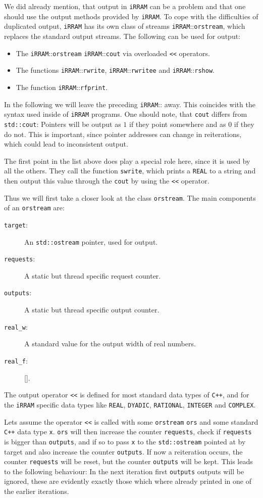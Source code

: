 \documentclass{article}
\newcommand{\irram}{\texttt{iRRAM}\xspace}
\newcommand{\cc}{\texttt{C++}\xspace}
\newcommand{\ir}[1]{\texttt{#1}}
\newcommand{\code}[1]{\texttt{#1}}
\begin{document}
We did already mention, that output in \irram can be a problem and that one should use the output methods provided by \irram. To cope with the difficulties of duplicated output, \irram has its own class of streams \irram::\ir{orstream}, which replaces the standard output streams. The following can be used for output:
\begin{itemize}
\item The \irram::\ir{orstream} \irram::\ir{cout} via overloaded \ir{<<} operators.
\item The functions \irram::\ir{rwrite}, \irram::\ir{rwritee} and \irram::\ir{rshow}.
\item The function \irram::\ir{rfprint}.
\end{itemize}
In the following we will leave the preceding \irram:: away. This coincides with the syntax used inside of \irram programs. One should note, that \ir{cout} differs from \texttt{std::cout}: Pointers will be output as $1$ if they point somewhere and as $0$ if they do not. This is important, since pointer addresses can change in reiterations, which could lead to inconsistent output.

The first point in the list above does play a special role here, since it is used by all the others. They call the function \ir{swrite}, which prints a \ir{REAL} to a string and then output this value through the \ir{cout} by using the \ir{<<} operator.

Thus we will first take a closer look at the class \ir{orstream}. The main components of an \ir{orstream} are:
\begin{description}
\item[\code{target}:] An \texttt{std::ostream} pointer, used for output.
\item[\code{requests}:] A static but thread specific request counter.
\item[\code{outputs}:] A static but thread specific output counter.
\item[\code{real\_w}:] A standard value for the output width of real numbers.
\item[\code{real\_f}:] \ref{}.
\end{description}
The output operator \code{<<} is defined for most standard data types of \cc, and for the \irram specific data types like \ir{REAL}, \ir{DYADIC}, \ir{RATIONAL}, \ir{INTEGER} and \ir{COMPLEX}.

Lets assume the operator \code{<<} is called with some \ir{orstream} \code{ors} and some standard \cc data type \code{x}. \code{ors} will then increase the counter \code{requests}, check if \code{requests} is bigger than \code{outputs}, and if so to pass \code{x} to the \ir{std::ostream} pointed at by target and also increase the counter \code{outputs}. If now a reiteration occurs, the counter \code{requests} will be reset, but the counter \code{outputs} will be kept. This leads to the following behaviour: In the next iteration first \code{outputs} outputs will be ignored, these are evidently exactly those which where already printed in one of the earlier iterations.
\end{document}
